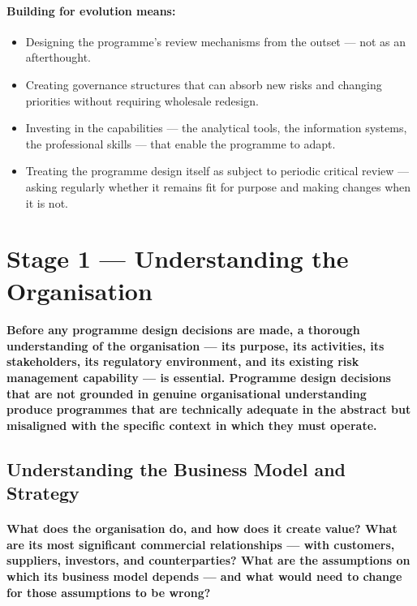 \paragraph{Building for evolution means:}
\begin{itemize}
  \item{Designing the programme's review mechanisms from the outset — not as an afterthought.}
  \item{Creating governance structures that can absorb new risks and changing priorities without requiring wholesale redesign.}
  \item{Investing in the capabilities — the analytical tools, the information systems, the professional skills — that enable the programme to adapt.}
  \item{Treating the programme design itself as subject to periodic critical review — asking regularly whether it remains fit for purpose and making changes when it is not.}
\end{itemize}

\section{Stage 1 — Understanding the Organisation}
\paragraph{Before any programme design decisions are made, a thorough understanding of the organisation — its purpose, its activities, its stakeholders, its regulatory environment, and its existing risk management capability — is essential. Programme design decisions that are not grounded in genuine organisational understanding produce programmes that are technically adequate in the abstract but misaligned with the specific context in which they must operate.}

\subsection{Understanding the Business Model and Strategy}
\paragraph{What does the organisation do, and how does it create value? What are its most significant commercial relationships — with customers, suppliers, investors, and counterparties? What are the assumptions on which its business model depends — and what would need to change for those assumptions to be wrong?}

